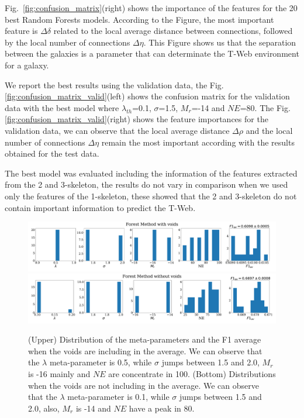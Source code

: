 \documentclass[usenatbib]{mnras}
\begin{document}
Fig.~\ref{fig:confusion_matrix}(right) shows the importance of the features
for the 20 best Random Forests models. According to the Figure, the 
most important feature is $\Delta \delta$
related to the local average distance between connections, followed by
the local number of connections $\Delta \eta$. This Figure shows
us that the separation between the galaxies is a parameter that can determinate the T-Web environment for a galaxy. 

We report the best results using the validation data, the Fig. \ref{fig:confusion_matrix_valid}(left) shows the confusion matrix for the validation data with the best model where $\lambda_{th}$=0.1, $\sigma$=1.5, $M_r$=-14 and $NE$=80. The Fig. \ref{fig:confusion_matrix_valid}(right) shows the feature importances for the validation data, we can observe that the local average distance $\Delta \rho$ and the local number of connections $\Delta \eta$ remain the most important according with the results obtained for the test data.

The best model was evaluated including the information of the features
extracted from the 2 and 3-skeleton, the results do not vary in
comparison when we used only the features of the 1-skeleton, these
showed that the 2 and 3-skeleton do not contain important information
to predict the T-Web. 




\begin{figure}
\centering
    \includegraphics[scale=0.23]{Figs/p_features_Forest_F1_av.pdf}
    \includegraphics[scale=0.23]{Figs/p_features_Forest_F1_av_no_voids.pdf}
    \caption{(Upper) Distribution of the meta-parameters and the F1 average
      when the voids are including in the average. We can observe that
      the $\lambda$ meta-parameter is 0.5, while $\sigma$
      jumps between 1.5 and 2.0, $M_r$ is -16 mainly and $NE$ are concentrate in 100.
      (Bottom) Distributions when the voids are not including in the average. We can observe that
      the $\lambda$ meta-parameter is 0.1, while $\sigma$
      jumps between 1.5 and 2.0, also, $M_r$ is -14 and $NE$ have a peak in 80.
      } 
    \label{fig:features_void}    
\end{figure}
\end{document}
